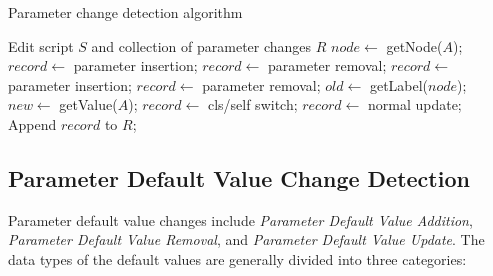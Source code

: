 \begin{algorithm}
	\label{algo:parameter-change-detection}
	\caption{Parameter change detection algorithm}
	\begin{algorithmic}
		\REQUIRE Edit script $S$ and collection of parameter changes $R$
			\STATE $node \gets$ getNode($A$);
				\STATE $record \gets$ parameter insertion;
				\STATE $record \gets$ parameter removal;
				\STATE $record \gets$ parameter insertion;
				\STATE $record \gets$ parameter removal;
				\STATE $old \gets$ getLabel($node$);
				\STATE $new \gets$ getValue($A$);
					\STATE $record \gets$ cls/self switch;
				\ELSE
					\STATE $record \gets$ normal update;
				\ENDIF
			\ENDIF
			\STATE Append $record$ to $R$;
		\ENDFOR
	\end{algorithmic}
\end{algorithm}

\subsection{Parameter Default Value Change Detection}

Parameter default value changes include \textit{Parameter Default Value Addition}, \textit{Parameter Default Value Removal}, and \textit{Parameter Default Value Update}. The data types of the default values are generally divided into three categories:

